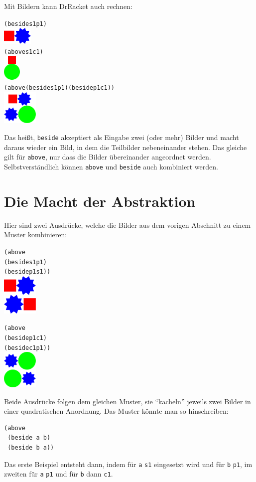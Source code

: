 %
Mit Bildern kann DrRacket auch rechnen:
%
\begin{alltt}
(beside s1 p1)
\evalsto{} \includegraphics[height=24pt]{i1prog/beside.png}
(above s1 c1)
\evalsto{} \includegraphics[width=24pt]{i1prog/above.png}
(above (beside s1 p1) (beside p1 c1))
\evalsto{} \includegraphics[width=48pt]{i1prog/abovebeside.png}
\end{alltt}              
%
Das heißt, \texttt{beside} akzeptiert als Eingabe zwei (oder mehr)
Bilder und macht daraus wieder ein Bild, in dem die Teilbilder
nebeneinander stehen.  Das gleiche gilt für \texttt{above}, nur dass
die Bilder übereinander angeordnet werden.  Selbstverständlich können
\texttt{above} und \texttt{beside} auch kombiniert werden.

\section{Die Macht der Abstraktion}

Hier sind zwei Ausdrücke, welche die Bilder aus dem vorigen Abschnitt
zu einem Muster kombinieren:
%
\begin{alltt}
(above
 (beside s1 p1)
 (beside p1 s1))
\evalsto{} \includegraphics[width=48pt]{i1prog/tile1}

(above
 (beside p1 c1)
 (beside c1 p1))
\evalsto{} \includegraphics[width=48pt]{i1prog/tile2}
\end{alltt}
%
Beide Ausdrücke folgen dem gleichen Muster, sie "`kacheln"' jeweils zwei
Bilder in einer quadratischen Anordnung.  Das Muster könnte man so
hinschreiben:
%
\begin{verbatim}
(above
 (beside a b)
 (beside b a))
\end{verbatim}
%
Das erste Beispiel entsteht dann, indem für \texttt{a} \texttt{s1}
eingesetzt wird und für \texttt{b} \texttt{p1}, im zweiten für \texttt{a}
\texttt{p1} und für \texttt{b} dann \texttt{c1}.

